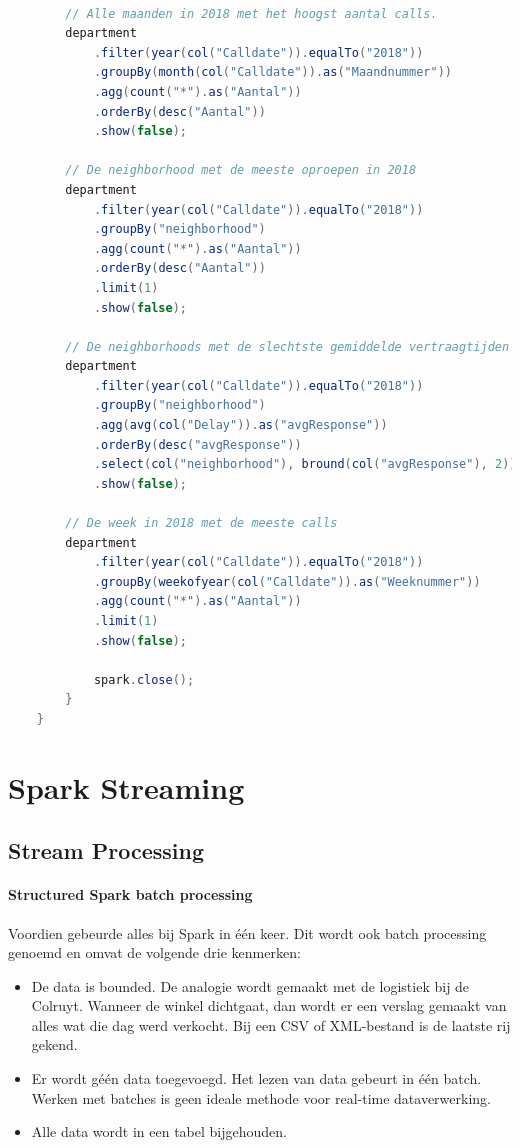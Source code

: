 \documentclass[a4paper,10pt,twoside]{report}
\begin{document}
		\newpage
		
		\begin{lstlisting}[language=Java]
			
		// Alle maanden in 2018 met het hoogst aantal calls.
		department
			.filter(year(col("Calldate")).equalTo("2018"))
			.groupBy(month(col("Calldate")).as("Maandnummer"))
			.agg(count("*").as("Aantal"))
			.orderBy(desc("Aantal"))
			.show(false);
			
		// De neighborhood met de meeste oproepen in 2018
		department
			.filter(year(col("Calldate")).equalTo("2018"))
			.groupBy("neighborhood")
			.agg(count("*").as("Aantal"))
			.orderBy(desc("Aantal"))
			.limit(1)
			.show(false);
			
		// De neighborhoods met de slechtste gemiddelde vertraagtijden bij een omroep.
		department
			.filter(year(col("Calldate")).equalTo("2018"))
			.groupBy("neighborhood")
			.agg(avg(col("Delay")).as("avgResponse"))
			.orderBy(desc("avgResponse"))
			.select(col("neighborhood"), bround(col("avgResponse"), 2))
			.show(false);
			
		// De week in 2018 met de meeste calls
		department
			.filter(year(col("Calldate")).equalTo("2018"))
			.groupBy(weekofyear(col("Calldate")).as("Weeknummer"))
			.agg(count("*").as("Aantal"))
			.limit(1)
			.show(false);
			
			spark.close();
		}
	}
\end{lstlisting}

\chapter{Spark Streaming}

\section{Stream Processing}

\subsubsection{Structured Spark batch processing}

Voordien gebeurde alles bij Spark in één keer. Dit wordt ook batch processing genoemd en omvat de volgende drie kenmerken:

\begin{itemize}
	\item De data is bounded. De analogie wordt gemaakt met de logistiek bij de Colruyt. Wanneer de winkel dichtgaat, dan wordt er een verslag gemaakt van alles wat die dag werd verkocht. Bij een CSV of XML-bestand is de laatste rij gekend.
	\item Er wordt géén data toegevoegd. Het lezen van data gebeurt in één batch. Werken met batches is geen ideale methode voor real-time dataverwerking.
	\item Alle data wordt in een tabel bijgehouden.
\end{itemize}
\end{document}

